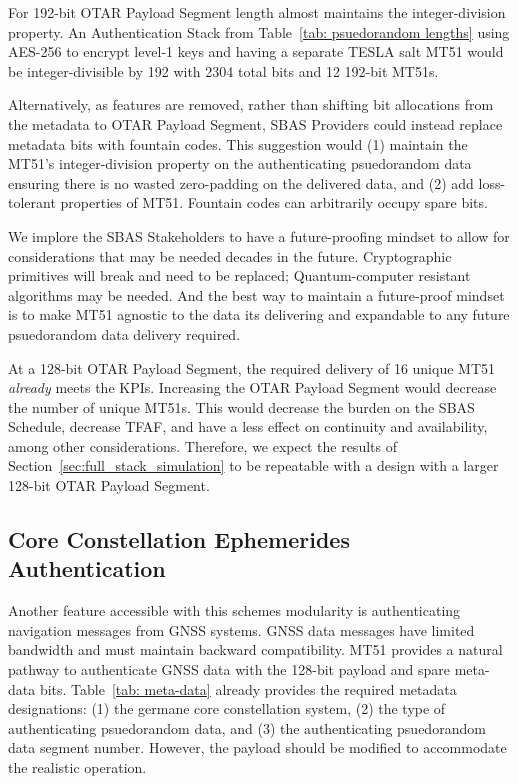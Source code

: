 \documentclass[letterpaper,times]{IONconf/IONconf}
\begin{document}
		For 192-bit OTAR Payload Segment length almost maintains the integer-division property.
		An Authentication Stack from Table~\ref{tab: psuedorandom lengths} using AES-256 to encrypt level-1 keys and having a separate TESLA salt MT51 would be integer-divisible by 192 with 2304 total bits and 12 192-bit MT51s.

		Alternatively, as features are removed, rather than shifting bit allocations from the metadata to OTAR Payload Segment, SBAS Providers could instead replace metadata bits with fountain codes.
		This suggestion would (1) maintain the MT51's integer-division property on the authenticating psuedorandom data ensuring there is no wasted zero-padding on the delivered data, and (2) add loss-tolerant properties of MT51.
		Fountain codes can arbitrarily occupy spare bits.
		
		We implore the SBAS Stakeholders to have a future-proofing mindset to allow for considerations that may be needed decades in the future.
		Cryptographic primitives will break and need to be replaced; Quantum-computer resistant algorithms may be needed.
		And the best way to maintain a future-proof mindset is to make MT51 agnostic to the data its delivering and expandable to any future psuedorandom data delivery required.

		At a 128-bit OTAR Payload Segment, the required delivery of 16 unique MT51 {\em already} meets the KPIs.
		Increasing the OTAR Payload Segment would decrease the number of unique MT51s.
		This would decrease the burden on the SBAS Schedule, decrease TFAF, and have a less effect on continuity and availability, among other considerations.
		Therefore, we expect the results of Section~\ref{sec:full_stack_simulation} to be repeatable with a design with a larger 128-bit OTAR Payload Segment.

	\subsection{Core Constellation Ephemerides Authentication} \label{sub:core_eph}

		Another feature accessible with this schemes modularity is authenticating navigation messages from GNSS systems.
		GNSS data messages have limited bandwidth and must maintain backward compatibility.
		MT51 provides a natural pathway to authenticate GNSS data with the 128-bit payload and spare meta-data bits.
		Table~\ref{tab: meta-data} already provides the required metadata designations: (1) the germane core constellation system, (2) the type of authenticating psuedorandom data, and (3) the authenticating psuedorandom data segment number.
		However, the payload should be modified to accommodate the realistic operation.
\end{document}
